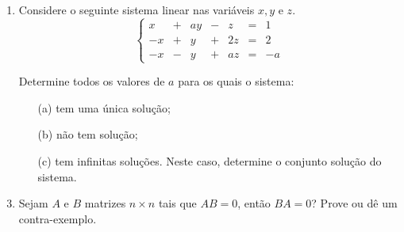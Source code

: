 \documentclass[glenn,refnum,codigo]{Estilo}
\begin{document}
\begin{enumerate}
	\item Considere o seguinte sistema linear nas variáveis $x, y$ e $z$.
	\[
	\left\{
	\begin{array}{rcrcrcr}
	x & + & ay & - &  z & = & 1 \\
	-x & + &  y & + & 2z & = & 2 \\
	-x & - &  y & + & az & = & -a
	\end{array}
	\right.
	\]
	
	\item[]Determine todos os valores de $a$ para os quais o sistema:
	
	\begin{enumerate}
		\item[(a)] tem uma única solução;
		\item[(b)] não tem solução;
		\item[(c)] tem infinitas soluções. Neste caso, determine o conjunto solução do sistema.
	\end{enumerate}
	
	\item Sejam $A$ e $B$ matrizes $n\times n$ tais que $AB = 0$, então $BA = 0$? Prove ou dê um contra-exemplo.
\end{enumerate}




\renewcommand{\bibname}{Referências} %

\end{document}
